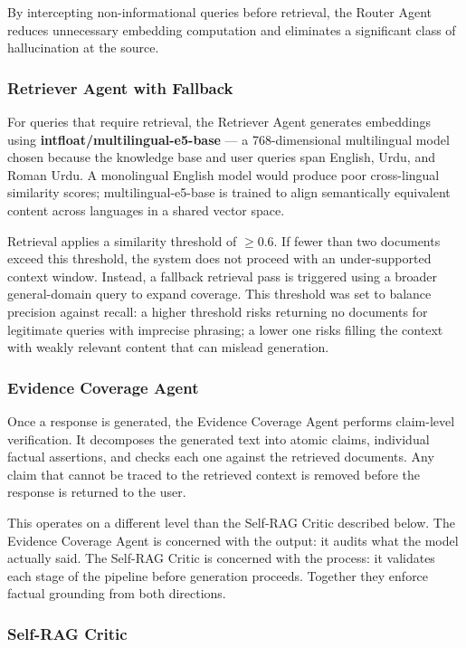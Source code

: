 By intercepting non-informational queries before retrieval, the Router Agent 
reduces unnecessary embedding computation and eliminates a significant class of 
hallucination at the source.

\subsubsection*{Retriever Agent with Fallback}

For queries that require retrieval, the Retriever Agent generates embeddings 
using \textbf{intfloat/multilingual-e5-base} — a 768-dimensional multilingual 
model chosen because the knowledge base and user queries span English, Urdu, and 
Roman Urdu. A monolingual English model would produce poor cross-lingual 
similarity scores; multilingual-e5-base is trained to align semantically 
equivalent content across languages in a shared vector space.

Retrieval applies a similarity threshold of $\geq 0.6$. If fewer than two 
documents exceed this threshold, the system does not proceed with an 
under-supported context window. Instead, a fallback retrieval pass is triggered 
using a broader general-domain query to expand coverage. This threshold was set 
to balance precision against recall: a higher threshold risks returning no 
documents for legitimate queries with imprecise phrasing; a lower one risks 
filling the context with weakly relevant content that can mislead generation.

\subsubsection*{Evidence Coverage Agent}

Once a response is generated, the Evidence Coverage Agent performs claim-level 
verification. It decomposes the generated text into atomic claims, individual 
factual assertions, and checks each one against the retrieved documents. Any 
claim that cannot be traced to the retrieved context is removed before the 
response is returned to the user.

This operates on a different level than the Self-RAG Critic described below. The 
Evidence Coverage Agent is concerned with the output: it audits what the model 
actually said. The Self-RAG Critic is concerned with the process: it validates 
each stage of the pipeline before generation proceeds. Together they enforce 
factual grounding from both directions.

\subsubsection*{Self-RAG Critic}

